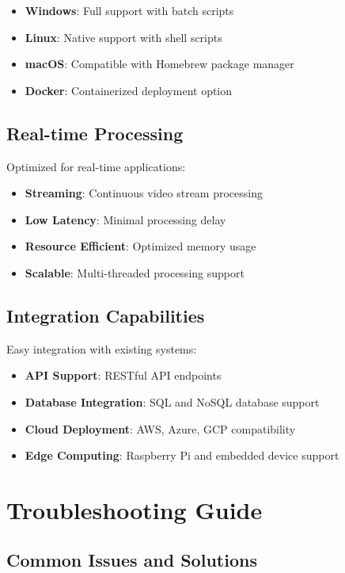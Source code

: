 \documentclass[12pt,a4paper]{article}
\begin{document}
\begin{itemize}
    \item \textbf{Windows}: Full support with batch scripts
    \item \textbf{Linux}: Native support with shell scripts
    \item \textbf{macOS}: Compatible with Homebrew package manager
    \item \textbf{Docker}: Containerized deployment option
\end{itemize}

\subsection{Real-time Processing}
Optimized for real-time applications:

\begin{itemize}
    \item \textbf{Streaming}: Continuous video stream processing
    \item \textbf{Low Latency}: Minimal processing delay
    \item \textbf{Resource Efficient}: Optimized memory usage
    \item \textbf{Scalable}: Multi-threaded processing support
\end{itemize}

\subsection{Integration Capabilities}
Easy integration with existing systems:

\begin{itemize}
    \item \textbf{API Support}: RESTful API endpoints
    \item \textbf{Database Integration}: SQL and NoSQL database support
    \item \textbf{Cloud Deployment}: AWS, Azure, GCP compatibility
    \item \textbf{Edge Computing}: Raspberry Pi and embedded device support
\end{itemize}

\section{Troubleshooting Guide}

\subsection{Common Issues and Solutions}
\end{document}
